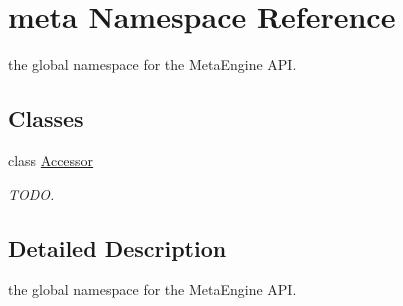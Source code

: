 \hypertarget{namespacemeta}{\section{meta Namespace Reference}
\label{namespacemeta}
}


the global namespace for the Meta\-Engine A\-P\-I.  


\subsection*{Classes}
\begin{DoxyCompactItemize}
\item 
class \hyperlink{classmeta_1_1_accessor}{Accessor}
\begin{DoxyCompactList}\small\item\em T\-O\-D\-O. \end{DoxyCompactList}\end{DoxyCompactItemize}


\subsection{Detailed Description}
the global namespace for the Meta\-Engine A\-P\-I. 
